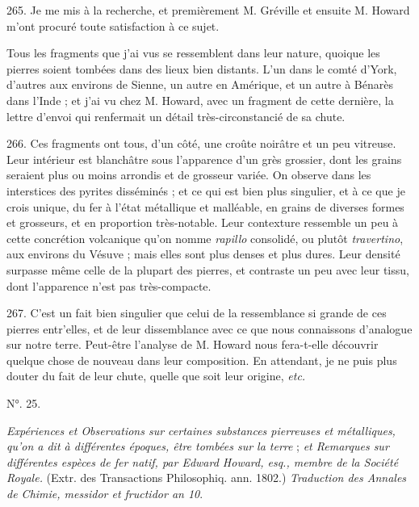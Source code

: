 \documentclass[a4paper, 11pt, oneside, polutonikogreek, french]{article}
\begin{document}
265. Je me mis à la recherche, et premièrement M. Gréville et ensuite M. Howard m'ont procuré toute satisfaction à ce sujet.

Tous les fragments que j'ai vus se ressemblent dans leur nature, quoique les pierres soient tombées dans des lieux bien distants. L'un dans le comté d'York, d'autres aux environs de Sienne, un autre en Amérique, et un autre à Bénarès dans l'Inde ; et j'ai vu chez M. Howard, avec un fragment de cette dernière, la lettre d'envoi qui renfermait un détail très-circonstancié de sa chute.

266. Ces fragments ont tous, d'un côté, une croûte noirâtre et un peu vitreuse. Leur intérieur est blanchâtre sous l'apparence d'un grès grossier, dont les grains seraient plus ou moins arrondis et de grosseur variée. On observe dans les interstices des pyrites disséminés ; et ce qui est bien plus singulier, et à ce que je crois unique, du fer à l'état métallique et malléable, en grains de diverses formes et grosseurs, et en proportion très-notable. Leur contexture ressemble un peu à cette concrétion volcanique qu'on nomme \emph{rapillo} consolidé, ou plutôt \emph{travertino}, aux environs du Vésuve ; mais elles sont plus denses et plus dures. Leur densité surpasse même celle de la plupart des pierres, et contraste un peu avec leur tissu, dont l'apparence n'est pas très-compacte.

267. C'est un fait bien singulier que celui de la ressemblance si grande de ces pierres entr'elles, et de leur dissemblance avec ce que nous connaissons d'analogue sur notre terre. Peut-être l'analyse de M. Howard nous fera-t-elle découvrir quelque chose de nouveau dans leur composition. En attendant, je ne puis plus douter du fait de leur chute, quelle que soit leur origine, \emph{etc.}

\begin{center}
N°. 25.
\end{center}

\emph{Expériences et Observations sur certaines substances pierreuses et métalliques, qu'on a dit à différentes époques, être tombées sur la terre} ; \emph{et Remarques sur différentes espèces de fer natif, par Edward Howard, esq., membre de la Société Royale.} (Extr. des Transactions Philosophiq. ann. 1802.) \emph{Traduction des Annales de Chimie, messidor et fructidor an 10}.
\end{document}
